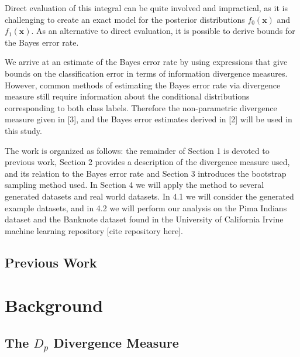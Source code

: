 \documentclass{article}
\begin{document}
		\noindent
		Direct evaluation of this integral can be quite involved and impractical, as it is challenging to create an exact model for the posterior distributions $f_0(\textbf{x})$ and $f_1(\textbf{x})$. As an alternative to direct evaluation, it is possible to derive bounds for the Bayes error rate.
		
		\noindent
		We arrive at an estimate of the Bayes error rate by using expressions that give bounds on the classification error in terms of information divergence measures. However, common methods of estimating the Bayes error rate via divergence measure still require information about the conditional distributions corresponding to both class labels. Therefore the non-parametric divergence measure given in [3], and the Bayes error estimates derived in [2] will be used in this study.     
		
		\noindent
		The work is organized as follows: the remainder of Section 1 is devoted to previous work, Section 2 provides a description of the divergence measure used, and its relation to the Bayes error rate and Section 3 introduces the bootstrap sampling method used. In Section 4 we will apply the method to several generated datasets and real world datasets. In 4.1 we will consider the generated example datasets, and in 4.2 we will perform our analysis on the Pima Indians dataset and the Banknote dataset found in the University of California Irvine machine learning repository [cite repository here].
		
		
		
		\subsection*{\small Previous Work}
		
		
		
	\section*{Background}
	
	\subsection*{\small The $D_p$ Divergence Measure}
\end{document}
